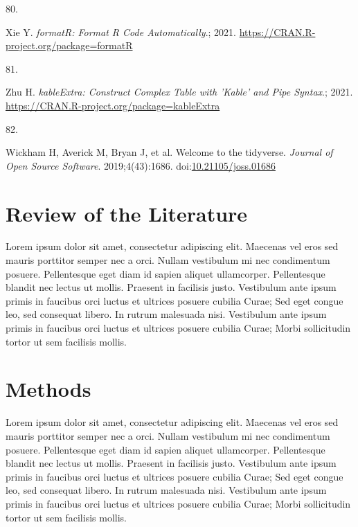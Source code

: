 \documentclass[11pt]{umnthesis}
\newlength{\csllabelwidth}
\newlength{\cslhangindent}
\newenvironment{CSLReferences}[2] %
 {%
  \setlength{\parindent}{0pt}
  \ifodd #1 \everypar{\setlength{\hangindent}{\cslhangindent}}\ignorespaces\fi
  \ifnum #2 > 0
  \setlength{\parskip}{#2\baselineskip}
  \fi
 }%
 {}
\newcommand{\CSLLeftMargin}[1]{\parbox[t]{\csllabelwidth}{#1}}
\newcommand{\CSLRightInline}[1]{\parbox[t]{\linewidth - \csllabelwidth}{#1}}
\begin{document}
\begin{CSLReferences}{0}{0}
\leavevmode{}%
\CSLLeftMargin{80. }
\CSLRightInline{Xie Y. \emph{{formatR}: Format {R} Code Automatically}.; 2021. \url{https://CRAN.R-project.org/package=formatR}}

\leavevmode{}%
\CSLLeftMargin{81. }
\CSLRightInline{Zhu H. \emph{{kableExtra}: Construct Complex Table with 'Kable' and Pipe Syntax}.; 2021. \url{https://CRAN.R-project.org/package=kableExtra}}

\leavevmode{}%
\CSLLeftMargin{82. }
\CSLRightInline{Wickham H, Averick M, Bryan J, et al. Welcome to the {tidyverse}. \emph{Journal of Open Source Software}. 2019;4(43):1686. doi:\href{https://doi.org/10.21105/joss.01686}{10.21105/joss.01686}}

\end{CSLReferences}

\hypertarget{litreview}{%
\chapter{Review of the Literature}\label{litreview}}

Lorem ipsum dolor sit amet, consectetur adipiscing elit. Maecenas vel eros sed mauris porttitor semper nec a orci. Nullam vestibulum mi nec condimentum posuere. Pellentesque eget diam id sapien aliquet ullamcorper. Pellentesque blandit nec lectus ut mollis. Praesent in facilisis justo. Vestibulum ante ipsum primis in faucibus orci luctus et ultrices posuere cubilia Curae; Sed eget congue leo, sed consequat libero. In rutrum malesuada nisi. Vestibulum ante ipsum primis in faucibus orci luctus et ultrices posuere cubilia Curae; Morbi sollicitudin tortor ut sem facilisis mollis.

\hypertarget{methods}{%
\chapter{Methods}\label{methods}}

Lorem ipsum dolor sit amet, consectetur adipiscing elit. Maecenas vel eros sed mauris porttitor semper nec a orci. Nullam vestibulum mi nec condimentum posuere. Pellentesque eget diam id sapien aliquet ullamcorper. Pellentesque blandit nec lectus ut mollis. Praesent in facilisis justo. Vestibulum ante ipsum primis in faucibus orci luctus et ultrices posuere cubilia Curae; Sed eget congue leo, sed consequat libero. In rutrum malesuada nisi. Vestibulum ante ipsum primis in faucibus orci luctus et ultrices posuere cubilia Curae; Morbi sollicitudin tortor ut sem facilisis mollis.
\end{document}
